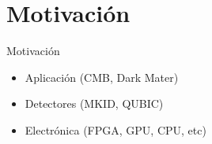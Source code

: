 \documentclass[ignorenonframetext,12pt]{beamer}
\begin{document}
\section{Motivación}
\begin{frame}{Motivación}
				\begin{itemize}
								\item Aplicación (CMB, Dark Mater)
								\item Detectores (MKID, QUBIC)
								\item Electrónica (FPGA, GPU, CPU, etc)
				\end{itemize}

\end{frame}
\end{document}
